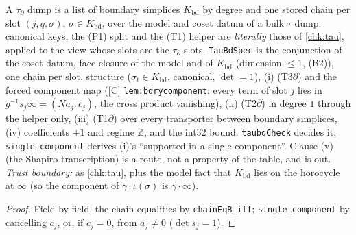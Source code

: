 \begin{definition}\label{chk:taubd}
  \leanok
  A $\tau_\partial$ dump is a list of boundary simplices $K_{\mathrm{bd}}$ by degree and one stored chain per slot $(j,q,\sigma)$,
  $\sigma\in K_{\mathrm{bd}}$, over the model and coset datum of a bulk $\tau$ dump: canonical keys, the (P1) split and the (T1)
  helper are \emph{literally} those of \ref{chk:tau}, applied to the view whose slots are the $\tau_\partial$ slots. \texttt{TauBdSpec}
  is the conjunction of the coset datum, face closure of the model and of $K_{\mathrm{bd}}$ (dimension $\le1$, (B2)), one
  chain per slot, structure ($\sigma_t\in K_{\mathrm{bd}}$, canonical, $\det=1$), (i) (T3$\partial$) and the forced component map
  ([C] \texttt{lem:bdrycomponent}: every term of slot $j$ lies in $g^{-1}s_j\infty=(Na_j:c_j)$, the cross product vanishing),
  (ii) (T2$\partial$) in degree $1$ through the helper only, (iii) (T1$\partial$) over every transporter between boundary simplices,
  (iv) coefficients $\pm1$ and regime $\mathbb{Z}$, and the int32 bound. \texttt{taubdCheck} decides it; \texttt{single\_component}
  derives (i)'s ``supported in a single component''. Clause (v) (the Shapiro transcription) is a route, not a property of the
  table, and is out. \emph{Trust boundary:} as \ref{chk:tau}, plus the model fact that $K_{\mathrm{bd}}$ lies on the
  horocycle at $\infty$ (so the component of $\gamma\cdot\iota(\sigma)$ is $\gamma\cdot\infty$).
\end{definition}
\begin{proof}
  \leanok
  Field by field, the chain equalities by \texttt{chainEqB\_iff}; \texttt{single\_component} by cancelling $c_j$, or, if
  $c_j=0$, from $a_j\ne0$ ($\det s_j=1$).
\end{proof}

